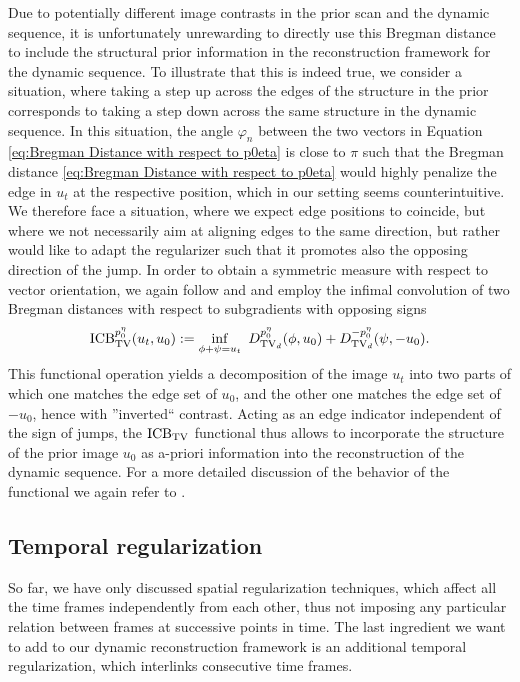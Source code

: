 Due to potentially different image contrasts in the prior scan and the dynamic sequence, it is unfortunately unrewarding to directly use this Bregman distance to include the structural prior information in the reconstruction framework for the dynamic sequence.
To illustrate that this is indeed true, we consider a situation, where taking a step up across the edges of the structure in the prior corresponds to taking a step down across the same structure in the dynamic sequence. 
In this situation, the angle $\varphi_n$ between the two vectors in Equation \eqref{eq:Bregman Distance with respect to p0eta} is close to $\pi$ such that the Bregman distance \eqref{eq:Bregman Distance with respect to p0eta} would highly penalize the edge in $u_t$ at the respective position, which in our setting seems counterintuitive. 
We therefore face a situation, where we expect edge positions to coincide, but where we not necessarily aim at aligning edges to the same direction, but rather would like to adapt the regularizer such that it promotes also the opposing direction of the jump. 
In order to obtain a symmetric measure with respect to vector orientation, we again follow \cite{Moeller:ColorBregmanTV} and \cite{Rasch2017} and employ the infimal convolution of two Bregman distances with respect to subgradients with opposing signs 
\begin{align*}
	\mathrm{ICB}_{\mathrm{TV}}^{p_0^\eta}(u_t,u_0) := \inf_{\phi + \psi = u_t} ~ D_{\mathrm{TV}_d}^{p_0^\eta}(\phi,u_0) + D_{\mathrm{TV}_d}^{-p_0^\eta}(\psi,-u_0).
\end{align*}
This functional operation yields a decomposition of the image $u_t$ into two parts of which one matches the edge set of $u_0$, and the other one matches the edge set of $-u_0$, hence with ''inverted`` contrast. 
Acting as an edge indicator independent of the sign of jumps, the $\mathrm{ICB}_{\mathrm{TV}}$ functional thus allows to incorporate the structure of the prior image $u_0$ as a-priori information into the reconstruction of the dynamic sequence. For a more detailed discussion of the behavior of the functional we again refer to \cite{Rasch2017}. 


\subsection{Temporal regularization}\label{subsec:temporal regularization}
So far, we have only discussed spatial regularization techniques, which affect all the time frames independently from each other, thus not imposing any particular relation between frames at successive points in time. 
The last ingredient we want to add to our dynamic reconstruction framework is an additional temporal regularization, which interlinks consecutive time frames.

